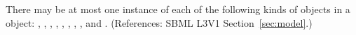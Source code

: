 There may be at most one instance of each of the following kinds of objects
in a \Model object: {\ListOfFunctionDefinitions,
\ListOfUnitDefinitions, \ListOfCompartments, \ListOfSpecies,
\ListOfParameters, \ListOfInitialAssignments, \ListOfRules,
\ListOfConstraints, \ListOfReactions} and
{\ListOfEvents}. (References: SBML L3V1
Section~\ref{sec:model}.)
